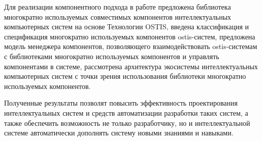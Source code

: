 Для реализации компонентного подхода в работе предложена библиотека многократно используемых совместимых компонентов интеллектуальных компьютерных систем на основе Технологии OSTIS, введена классификация и спецификация многократно используемых компонентов ostis-систем, предложена модель менеджера компонентов, позволяющего взаимодействовать ostis-системам с библиотеками многократно используемых компонентов и управлять компонентами в системе, рассмотрена архитектура экосистемы интеллектуальных компьютерных систем с точки зрения использования библиотеки многократно используемых компонентов.

Полученные результаты позволят повысить эффективность проектирования интеллектуальных систем и средств автоматизации разработки таких систем, а также обеспечить возможность не только разработчику, но и интеллектуальной системе автоматически дополнять систему новыми знаниями и навыками.

%